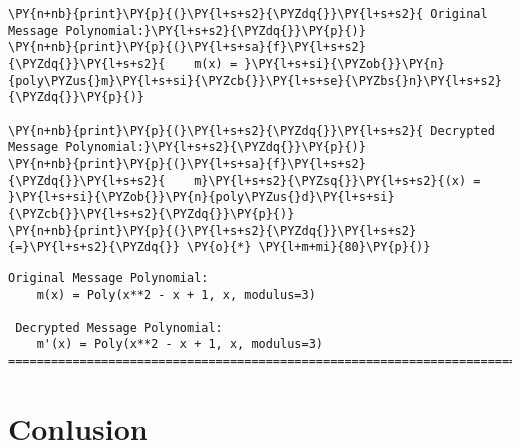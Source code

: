 \documentclass[a4paper,12pt]{article}
\begin{document}
\begin{tcolorbox}[breakable, size=fbox, boxrule=1pt, pad at break*=1mm,colback=cellbackground, colframe=cellborder]
\begin{Verbatim}[commandchars=\\\{\}]
\PY{n+nb}{print}\PY{p}{(}\PY{l+s+s2}{\PYZdq{}}\PY{l+s+s2}{ Original Message Polynomial:}\PY{l+s+s2}{\PYZdq{}}\PY{p}{)}
\PY{n+nb}{print}\PY{p}{(}\PY{l+s+sa}{f}\PY{l+s+s2}{\PYZdq{}}\PY{l+s+s2}{    m(x) = }\PY{l+s+si}{\PYZob{}}\PY{n}{poly\PYZus{}m}\PY{l+s+si}{\PYZcb{}}\PY{l+s+se}{\PYZbs{}n}\PY{l+s+s2}{\PYZdq{}}\PY{p}{)}

\PY{n+nb}{print}\PY{p}{(}\PY{l+s+s2}{\PYZdq{}}\PY{l+s+s2}{ Decrypted Message Polynomial:}\PY{l+s+s2}{\PYZdq{}}\PY{p}{)}
\PY{n+nb}{print}\PY{p}{(}\PY{l+s+sa}{f}\PY{l+s+s2}{\PYZdq{}}\PY{l+s+s2}{    m}\PY{l+s+s2}{\PYZsq{}}\PY{l+s+s2}{(x) = }\PY{l+s+si}{\PYZob{}}\PY{n}{poly\PYZus{}d}\PY{l+s+si}{\PYZcb{}}\PY{l+s+s2}{\PYZdq{}}\PY{p}{)}
\PY{n+nb}{print}\PY{p}{(}\PY{l+s+s2}{\PYZdq{}}\PY{l+s+s2}{=}\PY{l+s+s2}{\PYZdq{}} \PY{o}{*} \PY{l+m+mi}{80}\PY{p}{)}
\end{Verbatim}
\end{tcolorbox}

    \begin{Verbatim}[commandchars=\\\{\}]
 Original Message Polynomial:
    m(x) = Poly(x**2 - x + 1, x, modulus=3)

 Decrypted Message Polynomial:
    m'(x) = Poly(x**2 - x + 1, x, modulus=3)
========================================================================
    \end{Verbatim}





\newpage
\section{Conlusion}





\newpage
\end{document}
